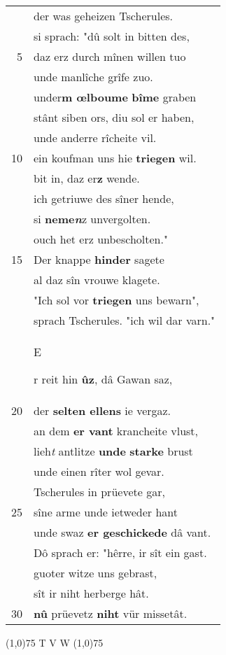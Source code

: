 \documentclass[8pt,a4paper,notitlepage]{article}
\begin{document}
\begin{table}[ht]
\begin{minipage}[t]{0.5\linewidth}
\begin{tabular}{rl}
 & der was geheizen Tscherules.\\ 
 & si sprach: "dû solt in bitten des,\\ 
5 & daz erz durch mînen willen tuo\\ 
 & unde manlîche grîfe zuo.\\ 
 & under\textbf{m œlboume} \textbf{bîme} graben\\ 
 & stânt siben ors, diu sol er haben,\\ 
 & unde anderre rîcheite vil.\\ 
10 & ein koufman uns hie \textbf{triegen} wil.\\ 
 & bit in, daz er\textbf{z} wende.\\ 
 & ich getriuwe des sîner hende,\\ 
 & si \textbf{neme\textit{n}}z unvergolten.\\ 
 & ouch het erz unbescholten."\\ 
15 & Der knappe \textbf{hinder} sagete\\ 
 & al daz sîn vrouwe klagete.\\ 
 & "Ich sol vor \textbf{triegen} uns bewarn",\\ 
 & sprach Tscherules. "ich wil dar varn."\\ 
 & \begin{large}E\end{large}r reit hin \textbf{ûz}, dâ Gawan saz,\\ 
20 & der \textbf{selten ellens} ie vergaz.\\ 
 & an dem \textbf{er vant} krancheite vlust,\\ 
 & lieh\textit{t} antlitze \textbf{unde} \textbf{starke} brust\\ 
 & unde einen rîter wol gevar.\\ 
 & Tscherules in prüevete gar,\\ 
25 & sîne arme unde ietweder hant\\ 
 & unde swaz \textbf{er geschickede} dâ vant.\\ 
 & Dô sprach er: "hêrre, ir sît ein gast.\\ 
 & guoter witze uns gebrast,\\ 
 & sît ir niht herberge hât.\\ 
30 & \textbf{nû} prüevetz \textbf{niht} vür missetât.\\ 
\end{tabular}
\scriptsize
\line(1,0){75} \newline
T V W \newline
\line(1,0){75} \newline

\end{minipage}
\end{table}
\end{document}
